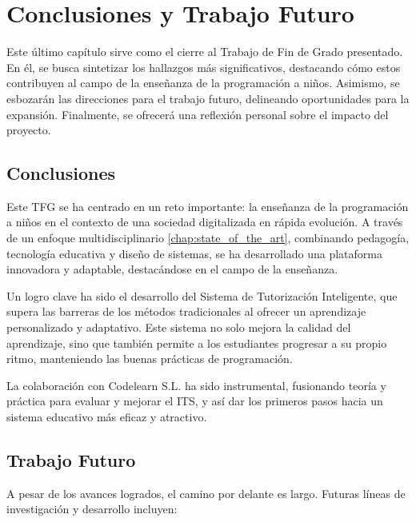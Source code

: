 \chapter{Conclusiones y Trabajo Futuro} \label{chap:conclusiones}

Este último capítulo sirve como el cierre al Trabajo de Fin de Grado presentado. En él, se busca sintetizar los hallazgos más significativos, destacando cómo estos contribuyen al campo de la enseñanza de la programación a niños. Asimismo, se esbozarán las direcciones para el trabajo futuro, delineando oportunidades para la expansión. Finalmente, se ofrecerá una reflexión personal sobre el impacto del proyecto.

\section{Conclusiones}

Este TFG se ha centrado en un reto importante: la enseñanza de la programación a niños en el contexto de una sociedad digitalizada en rápida evolución. A través de un enfoque multidisciplinario \ref{chap:state_of_the_art}, combinando pedagogía, tecnología educativa y diseño de sistemas, se ha desarrollado una plataforma innovadora y adaptable, destacándose en el campo de la enseñanza.

Un logro clave ha sido el desarrollo del Sistema de Tutorización Inteligente, que supera las barreras de los métodos tradicionales al ofrecer un aprendizaje personalizado y adaptativo. Este sistema no solo mejora la calidad del aprendizaje, sino que también permite a los estudiantes progresar a su propio ritmo, manteniendo las buenas prácticas de programación.

La colaboración con Codelearn S.L. ha sido instrumental, fusionando teoría y práctica para evaluar y mejorar el ITS, y así dar los primeros pasos hacia un sistema educativo más eficaz y atractivo.

\section{Trabajo Futuro}

A pesar de los avances logrados, el camino por delante es largo. Futuras líneas de investigación y desarrollo incluyen:

